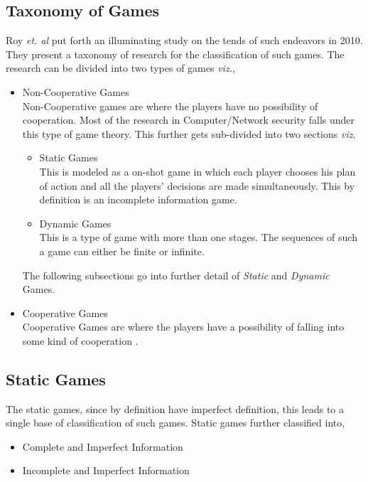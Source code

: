 \documentclass[conference]{IEEEtran}
\begin{document}
\subsection*{Taxonomy of Games}
Roy \textit{et. al}\cite{survey} put forth an illuminating study on the tends of such endeavors in 2010.
They present a taxonomy of research for the classification of such games.
The research can be divided into two types of games \textit{viz.},
\begin{itemize}
    \item{Non-Cooperative Games}\\
        Non-Cooperative games are where the players have no possibility of cooperation.
        Most of the research in Computer/Network security falls under this type of game theory.
        This further gets sub-divided into two sections \textit{viz},
        \begin{itemize}
            \item{Static Games}\\
            This is modeled as a on-shot game in which each player chooses his plan of action and all the players' decisions are made simultaneously.
            This by definition is an incomplete information game.
            \item{Dynamic Games}\\
            This is a type of game with more than one stages.
            The sequences of such a game can either be finite or infinite.
        \end{itemize}
        The following subsections go into further detail of \textit{Static} and \textit{Dynamic} Games.
    \item{Cooperative Games}\\
        Cooperative Games are where the players have a possibility of falling into some kind of cooperation \cite{wiki-coop}.
\end{itemize}

\subsection*{Static Games}
The static games, since by definition have imperfect definition, this leads to a single base of classification of such games.
Static games further classified into,
\begin{itemize}
    \item Complete and Imperfect Information
    \item Incomplete and Imperfect Information
\end{itemize}
\end{document}
